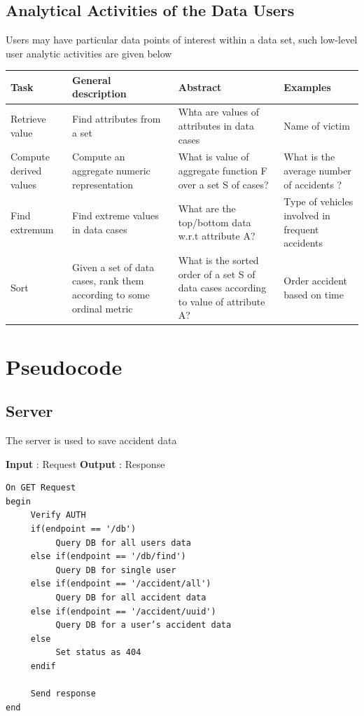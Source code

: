 \documentclass{llncs}
\begin{document}
\newpage
\subsection{Analytical Activities of the Data Users}
Users may have particular data points of interest within a data set, such low-level user analytic activities are given below

\begin{center}
\begin{tabular}{| m{5em} | m{10em}| m{10em} | m{10em} |} 
\hline
\textbf{Task} & \textbf{General description} & \textbf{Abstract} & \textbf{Examples} \\ 
\hline
Retrieve value & Find attributes from a set & Whta are values of attributes in data cases & Name of victim\\ 
\hline
Compute derived values & Compute an aggregate numeric representation & What is value of aggregate function F over a set S of cases? & What is the average number of accidents ? \\ 
\hline
Find extremum & Find extreme values in data cases & What are the top/bottom data w.r.t attribute A? & Type of vehicles involved in frequent accidents \\
\hline
Sort & Given a set of data cases, rank them according to some ordinal metric & What is the sorted order of a set S of data cases according to value of attribute A? & Order accident based on time \\
\hline
\end{tabular}
\end{center}

\section {Pseudocode}
\subsection{Server}

The server is used to save accident data

\noindent\textbf{Input} : Request \newline
\textbf{Output} : Response

\begin{verbatim}
On GET Request
begin
     Verify AUTH
     if(endpoint == '/db')
          Query DB for all users data
     else if(endpoint == '/db/find')
          Query DB for single user
     else if(endpoint == '/accident/all')
          Query DB for all accident data
     else if(endpoint == '/accident/uuid')
          Query DB for a user’s accident data
     else
          Set status as 404
     endif
     
     Send response
end
\end{verbatim}
\end{document}
